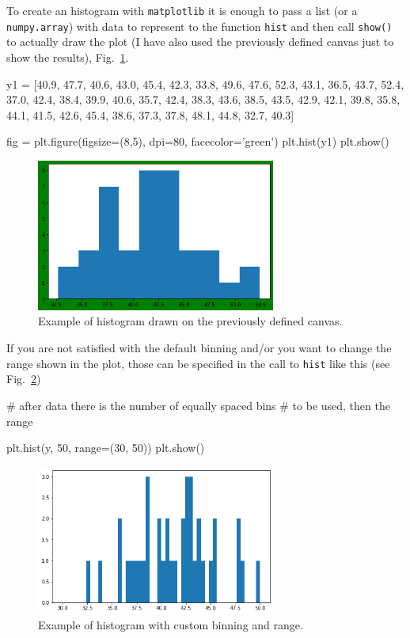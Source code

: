 \begin{ipython}
To create an histogram with \texttt{matplotlib} it is enough to pass a list (or a \texttt{numpy.array}) with data to represent to the function \texttt{hist} and then call \texttt{show()} to actually draw the plot (I have also used the previously defined canvas just to show the results), Fig.~\ref{fig:histo1}.

\begin{ipython}
y1 = [40.9, 47.7, 40.6, 43.0, 45.4, 42.3, 33.8, 49.6,
47.6, 52.3, 43.1, 36.5, 43.7, 52.4, 37.0, 42.4, 38.4, 39.9, 40.6, 35.7, 42.4,
38.3, 43.6, 38.5, 43.5, 42.9, 42.1, 39.8, 35.8, 44.1,
41.5, 42.6, 45.4, 38.6, 37.3, 37.8, 48.1, 44.8, 32.7, 40.3]

fig = plt.figure(figsize=(8,5), dpi=80, facecolor='green')
plt.hist(y1)
plt.show()
\end{ipython}

\begin{figure}[htb]
	\centering
	\includegraphics[width=0.7\textwidth]{figures/histo1}
	\caption{Example of histogram drawn on the previously defined canvas.}
	\label{fig:histo1}
\end{figure}

If you are not satisfied with the default binning and/or you want to
change the range shown in the plot, those can be specified in the call
to \texttt{hist} like this (see Fig.~\ref{fig:histo2})

\begin{ipython}
# after data there is the number of equally spaced bins
# to be used, then the range

plt.hist(y, 50, range=(30, 50))
plt.show()
\end{ipython}

\begin{figure}[htb]
	\centering
	\includegraphics[width=0.7\textwidth]{figures/histo2}
	\caption{Example of histogram with custom binning and range.}
	\label{fig:histo2}
\end{figure}


\end{ipython}
